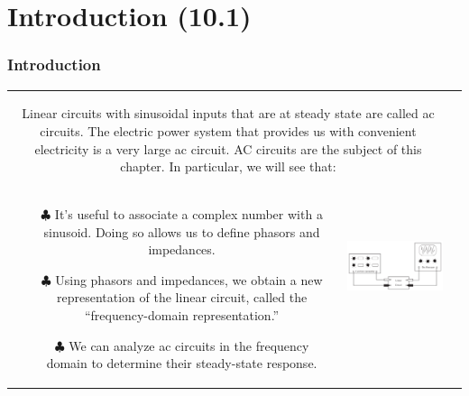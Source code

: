 \documentclass[aspectratio=169]{beamer}
\begin{document}
\section{Introduction (10.1)}
\begin{frame}[fragile]
	\frametitle{Introduction}
		\begin{tabular}{cc}
		
		
			\begin{columns}
	\small			\begin{column}{1\textwidth}  %
Linear circuits with sinusoidal inputs that are at steady state are called ac circuits. The electric
power system that provides us with convenient electricity is a very large ac circuit. AC circuits are the
subject of this chapter. In particular, we will see that: 	
						
				\end{column}
			\end{columns}\\
		
		
		
			\begin{columns}
\small				\begin{column}{.5\textwidth}  %
	
		
		\begin{itemize}
						\item[$\clubsuit$]{It’s useful to associate a complex number with a sinusoid. Doing so allows us to define phasors
and impedances.}
						\item[$\clubsuit$]{Using phasors and impedances, we obtain a new representation of the linear circuit, called the
“frequency-domain representation.”}
						\item[$\clubsuit$]{We can analyze ac circuits in the frequency 
						domain to determine their steady-state response.}		
	
					\end{itemize}
					
				\end{column}
				\begin{column}{.5\textwidth}  %
\includegraphics[height=3.5cm]{figure1.png}	
					
				\end{column}
			\end{columns}
		
	\end{tabular}
\end{frame}
\end{document}
